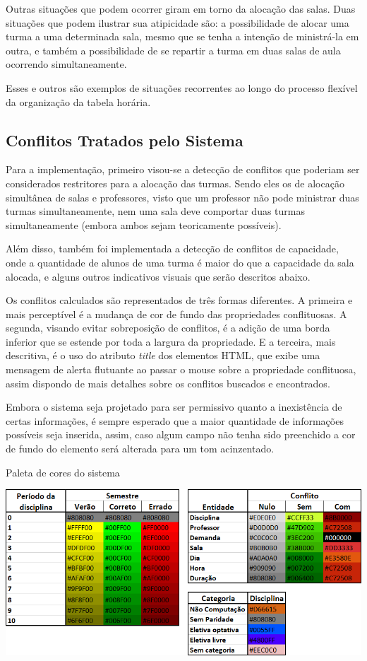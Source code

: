 Outras situações que podem ocorrer giram em torno da alocação das salas. Duas situações que podem ilustrar sua atipicidade são: a possibilidade de alocar uma turma a uma determinada sala, mesmo que se tenha a intenção de ministrá-la em outra, e também a possibilidade de se repartir a turma em duas salas de aula ocorrendo simultaneamente.

Esses e outros são exemplos de situações recorrentes ao longo do processo flexível da organização da tabela horária.

\subsection{Conflitos Tratados pelo Sistema}

Para a implementação, primeiro visou-se a detecção de conflitos que poderiam ser considerados restritores para a alocação das turmas. Sendo eles os de alocação simultânea de salas e professores, visto que um professor não pode ministrar duas turmas simultaneamente, nem uma sala deve comportar duas turmas simultaneamente (embora ambos sejam teoricamente possíveis).

Além disso, também foi implementada a detecção de conflitos de capacidade, onde a quantidade de alunos de uma turma é maior do que a capacidade da sala alocada, e alguns outros indicativos visuais que serão descritos abaixo.

Os conflitos calculados são representados de três formas diferentes. A primeira e mais perceptível é a mudança de cor de fundo das propriedades conflituosas. A segunda, visando evitar sobreposição de conflitos, é a adição de uma borda inferior que se estende por toda a largura da propriedade. E a terceira, mais descritiva, é o uso do atributo \textit{title} dos elementos HTML, que exibe uma mensagem de alerta flutuante ao passar o mouse sobre a propriedade conflituosa, assim dispondo de mais detalhes sobre os conflitos buscados e encontrados. %

Embora o sistema seja projetado para ser permissivo quanto a inexistência de certas informações, é sempre esperado que a maior quantidade de informações possíveis seja inserida, assim, caso algum campo não tenha sido preenchido a cor de fundo do elemento será alterada para um tom acinzentado.

\begin{MyCenteredFigure} \caption{Paleta de cores do sistema} \label{fig:conflitoDisciplinaPaleta}
  \includegraphics[width=\textwidth]{files/img/2.02!5-desenvolvimento/2.02!5.1.5-conflitos/Paleta de Cores}
\end{MyCenteredFigure}

